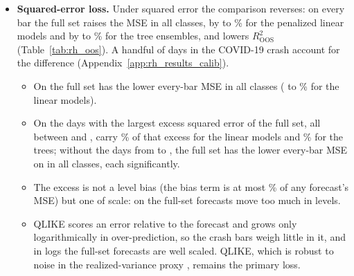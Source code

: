 \begin{itemize}
\begin{itemize}
    \rhorDmXgbB{} and \rhorDmRfB). %
  \end{itemize}
\item \textbf{Squared-error loss.} Under squared error the comparison reverses: on every bar the full set raises the
  MSE in all \rhorAfPairs{} classes, by \rhcaLinMsePctBarSpanMin{} to \rhcaLinMsePctBarSpanMax\% for the penalized
  linear models and by \rhcaTreeMsePctBarSpanMin{} to \rhcaTreeMsePctBarSpanMax\% for the tree ensembles, and lowers
  $R^2_{\mathrm{OOS}}$ (Table~\ref{tab:rh_oos}). A handful of days in the COVID-19 crash account for the difference
  (Appendix~\ref{app:rh_results_calib}).
  \begin{itemize}
  \item On \rhcaYearsPre{} the full set has the lower every-bar MSE in all classes (\rhcaLinMsePctBarPreMin{} to
    \rhcaLinMsePctBarPreMax\% for the linear models).
  \item On \rhcaYearsOos{} the \rhcaTopDays{} days with the largest excess squared error of the full set, all between
    \rhcaTopFirstBarOos{} and \rhcaTopLastBarOos, carry \rhcaLinTopShareBarOosRng\% of that excess for the linear
    models and \rhcaTreeTopShareBarOosRng\% for the trees; without the days from \rhcaCrashStart{} to \rhcaCrashEnd,
    the full set has the lower every-bar MSE on \rhcaYearsOos{} in all classes, each significantly.
  \item The excess is not a level bias (the bias term is at most \rhcaAllShBiasBarOosMax\% of any forecast's MSE) but
    one of scale: on \rhcaYearsOos{} the full-set forecasts move too much in levels.
  \item QLIKE scores an error relative to the forecast and grows only logarithmically in over-prediction, so the crash
    bars weigh little in it, and in logs the full-set forecasts are well scaled. QLIKE, which is robust to noise in
    the realized-variance proxy \citep{Patton2011}, remains the primary loss.
  \end{itemize}
\end{itemize}

